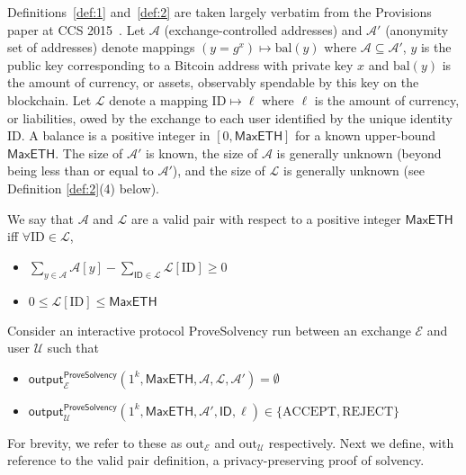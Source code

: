 Definitions~\ref{def:1} and~\ref{def:2} are taken largely verbatim from the Provisions paper at CCS 2015~\cite{provisions}. Let $\mathcal{A}$ (exchange-controlled addresses) and $\mathcal{A}'$ (anonymity set of addresses) denote mappings $(y = g^x) \mapsto \text{bal}(y)$ where $\mathcal{A} \subseteq \mathcal{A}'$, $y$ is the public key corresponding to a Bitcoin address with private key $x$ and $\text{bal}(y)$ is the amount of currency, or assets, observably spendable by this key on the blockchain. Let $\mathcal{L}$ denote a mapping $\text{ID} \mapsto \ell$ where $\ell$ is the amount of currency, or liabilities, owed by the exchange to each user identified by the unique identity ID. A balance is a positive integer in $[0,\mathsf{MaxETH}]$ for a known upper-bound $\mathsf{MaxETH}$. The size of $\mathcal{A}'$ is known, the size of $\mathcal{A}$ is generally unknown (beyond being less than or equal to $\mathcal{A}'$), and the size of $\mathcal{L}$ is generally unknown (see Definition \ref{def:2}(4) below). 

\begin{definition}
\label{def:1}

We say that $\mathcal{A}$ and $\mathcal{L}$ are a valid pair with respect to a positive integer $\mathsf{MaxETH}$ iff $\forall \text{ID} \in \mathcal{L}$,

\begin{itemize}
\item $\sum_{y \in \mathcal{A}} \mathcal{A}[y] - \sum_{\mathsf{ID} \in \mathcal{L}} \mathcal{L}[\text{ID}] \geq 0 \quad$
\item $0 \leq \mathcal{L}[\text{ID}] \leq \mathsf{MaxETH}$
\end{itemize}


Consider an interactive protocol ProveSolvency run between an exchange $\mathcal{E}$ and user $\mathcal{U}$ such that

\begin{itemize}
\item $\mathsf{output}_{\mathcal{E}}^{\mathsf{ProveSolvency}}(1^k, \mathsf{MaxETH}, \mathcal{A}, \mathcal{L}, \mathcal{A}') = \emptyset$
\item $\mathsf{output}_{\mathcal{U}}^{\mathsf{ProveSolvency}}(1^k, \mathsf{MaxETH}, \mathcal{A}', \mathsf{ID}, \ell) \in \{\text{ACCEPT}, \text{REJECT}\}$
\end{itemize}
   
\end{definition}

For brevity, we refer to these as $\text{out}_{\mathcal{E}}$ and $\text{out}_{\mathcal{U}}$ respectively. Next we define, with reference to the valid pair definition, a privacy-preserving proof of solvency.


